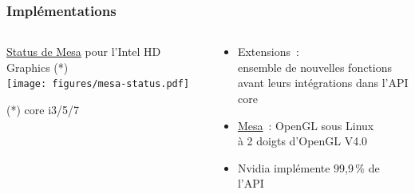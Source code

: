 \begin{frame}
  \frametitle{Implémentations}
  \begin{columns}
    \begin{column}{.5\textwidth}
      \begin{center}
        \href{http://mesamatrix.net}{Status de Mesa} pour l'Intel HD Graphics {\tiny (*)} \\[.5em]
        \texttt{[image: figures/mesa-status.pdf]} \\ %
      \end{center}
      {\tiny (*) core i3/5/7}
    \end{column}
    \begin{column}{.5\textwidth}
      \begin{itemize}
      \item Extensions~: \\
        ensemble de nouvelles fonctions \\
        avant leurs intégrations dans l'API core
      \item \href{http://www.mesa3d.org}{Mesa}~: OpenGL sous Linux \\
        à 2 doigts d'OpenGL V4.0
      \item Nvidia implémente 99,9\,\% de l'API %
      \end{itemize}
    \end{column}
  \end{columns}
\end{frame}

